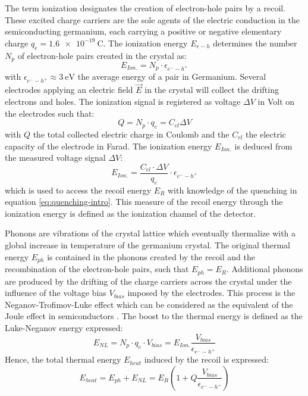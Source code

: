 The term ionization designates the creation of electron-hole pairs by a recoil. These excited charge carriers are the sole agents of the electric conduction in the semiconducting germanium, each carrying a positive or negative elementary charge $q_e = \SI{1.6e-19}{\coulomb}$.
The ionization energy $E_{e-h}$ determines the number $N_p$ of electron-hole pairs created in the crystal as:
\begin{equation}
E_{Ion.} = N_p \cdot \epsilon_{e^--h^+}
\end{equation}
with $\epsilon_{e^--h^+} \approx \SI{3}{\eV}$ the average energy of a pair in Germanium. 
Several electrodes applying an electric field $\vec{E}$ in the crystal will collect the drifting electrons and holes. The ionization signal is registered as voltage $\Delta V$ in Volt on the electrodes such that:
\begin{equation}
Q = N_p \cdot q_e = C_{el} \Delta V
\end{equation} 
with $Q$ the total collected electric charge in Coulomb and the $C_{el}$ the electric capacity of the electrode in Farad.
The ionization energy $E_{Ion.}$ is deduced from the measured voltage signal $\Delta V$:
\begin{equation}
E_{Ion.} = \frac{C_{el} \cdot \Delta V}{q_{e}} \cdot \epsilon_{e^--h^+}
\end{equation}
which is used to access the recoil energy $E_R$ with knowledge of the quenching in equation \ref{eq:quenching-intro}. This measure of the recoil energy through the ionization energy is defined as the ionization channel of the  detector.


Phonons are vibrations of the crystal lattice which eventually thermalize with a global increase in temperature of the germanium crystal. The original thermal energy $E_{ph}$ is contained in the phonons created by the recoil and the recombination of the electron-hole pairs, such that $E_{ph} = E_R$.
Additional phonons are produced by the drifting  of the charge carriers across the crystal under the influence of the voltage bias $V_{bias}$ imposed by the electrodes. This process is the Neganov-Trofimov-Luke effect which can be considered as the equivalent of the Joule effect in semiconductors \cite{Luke,Neganov:1985khw}.
The boost to the thermal energy is defined as the Luke-Neganov energy expressed:
\begin{equation}
E_{NL} = N_p \cdot q_e \cdot V_{bias} = E_{Ion.} \frac{V_{bias}}{\epsilon_{e^--h^+}}
\end{equation}
Hence, the total thermal energy $E_{heat}$ induced by the recoil is expressed:
\begin{equation}
E_{heat} = E_{ph} + E_{NL} = E_R \left( 1 + Q \frac{V_{bias}}{\epsilon_{e^--h^+}} \right)
\end{equation}

